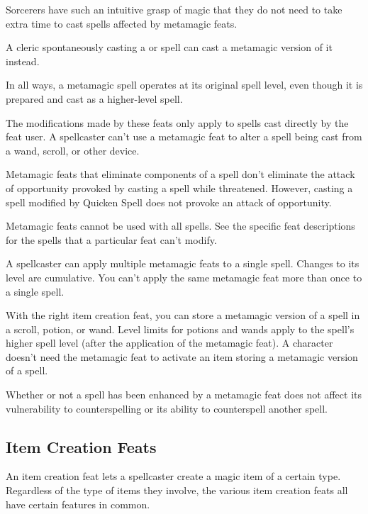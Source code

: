\par Sorcerers have such an intuitive grasp of magic that they do not need to take extra time to cast spells affected by metamagic feats.

 A cleric spontaneously casting a  or  spell can cast a metamagic version of it instead.

 In all ways, a metamagic spell operates at its original spell level, even though it is prepared and cast as a higher-level spell.

The modifications made by these feats only apply to spells cast directly by the feat user. A spellcaster can't use a metamagic feat to alter a spell being cast from a wand, scroll, or other device.

Metamagic feats that eliminate components of a spell don't eliminate the attack of opportunity provoked by casting a spell while threatened. However, casting a spell modified by Quicken Spell does not provoke an attack of opportunity.

Metamagic feats cannot be used with all spells. See the specific feat descriptions for the spells that a particular feat can't modify.

 A spellcaster can apply multiple metamagic feats to a single spell. Changes to its level are cumulative. You can't apply the same metamagic feat more than once to a single spell.

 With the right item creation feat, you can store a metamagic version of a spell in a scroll, potion, or wand. Level limits for potions and wands apply to the spell's higher spell level (after the application of the metamagic feat). A character doesn't need the metamagic feat to activate an item storing a metamagic version of a spell.

 Whether or not a spell has been enhanced by a metamagic feat does not affect its vulnerability to counterspelling or its ability to counterspell another spell.

\subsection{Item Creation Feats}
An item creation feat lets a spellcaster create a magic item of a certain type. Regardless of the type of items they involve, the various item creation feats all have certain features in common.

